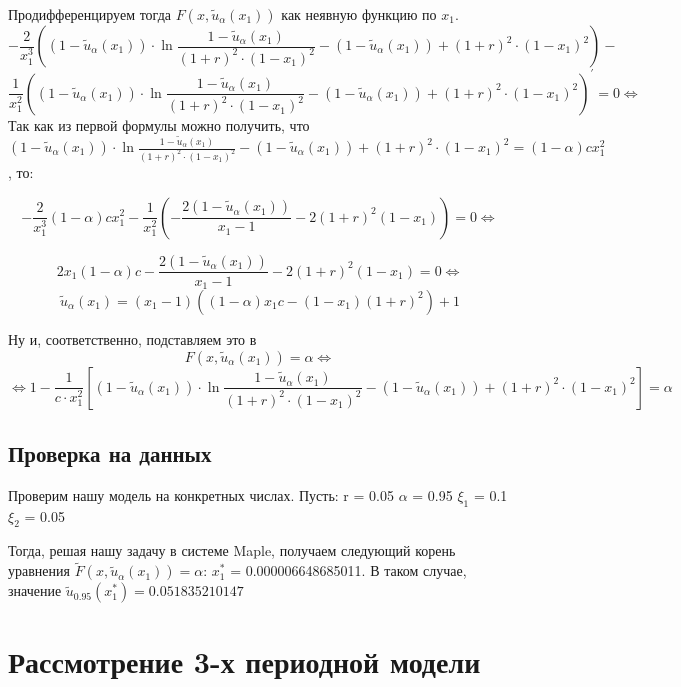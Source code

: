 \documentclass[14pt,a4paper]{article}
\theoremstyle{plain}
\theoremstyle{definition}
\begin{document}
\vspace{1pc}
Продифференцируем тогда $F(x,\tilde{u}_\alpha(x_1))$ как неявную функцию по $x_1$.
\vspace{1pc}
$$
-\frac{2}{x_1^3}\left( (1-\tilde{u}_\alpha(x_1) )\cdot \ln \frac{1-\tilde{u}_\alpha(x_1)}{(1+r)^2 \cdot (1-x_1)^2} - (1-\tilde{u}_\alpha(x_1)) + (1+r)^2 \cdot (1-x_1)^2 \right) -
$$
$$
\frac{1}{x_1^2}\left(  (1-\tilde{u}_\alpha(x_1) )\cdot \ln \frac{1-\tilde{u}_\alpha(x_1)}{(1+r)^2 \cdot (1-x_1)^2} - (1-\tilde{u}_\alpha(x_1)) + (1+r)^2 \cdot (1-x_1)^2  \right)^\prime  = 0 \Leftrightarrow
$$
\vspace{2pc}
Так как из первой формулы можно получить, что $ (1-\tilde{u}_\alpha(x_1)) \cdot \ln \frac{1-\tilde{u}_\alpha(x_1)}{(1+r)^2 \cdot (1-x_1)^2} - (1-\tilde{u}_\alpha(x_1)) + (1+r)^2 \cdot (1-x_1)^2 = (1-\alpha) c x_1^2$, то:

\vspace{2pc}
$$
-\frac{2}{x_1^3} (1-\alpha)cx_1^2 - \frac{1}{x_1^2}\left(-\frac{2 (1-\tilde{u}_\alpha(x_1))}{x_1-1} - 2(1+r)^2(1-x_1)\right)=0 \Leftrightarrow
$$

$$
2x_1(1-\alpha)c - \frac{2 (1-\tilde{u}_\alpha(x_1))}{x_1-1} - 2(1+r)^2(1-x_1)=0 \Leftrightarrow
$$
$$
\tilde{u}_\alpha(x_1) = (x_1-1)\left((1-\alpha)x_1c - (1-x_1)(1+r)^2 \right)+1
$$

Ну и, соответственно, подставляем это в
$$
F(x,\tilde{u}_\alpha(x_1)) = \alpha \Leftrightarrow
$$
$$
\Leftrightarrow 1-\frac{1}{c \cdot x_1^2}\left[ (1-\tilde{u}_\alpha(x_1)) \cdot \ln \frac{1-\tilde{u}_\alpha(x_1)}{(1+r)^2 \cdot (1-x_1)^2} - (1 - \tilde{u}_\alpha(x_1)) +(1+r)^2 \cdot (1-x_1)^2 \right] = \alpha
$$

 \subsection{Проверка на данных}
\vspace{2pc}


Проверим нашу модель на конкретных числах.
Пусть:
r = 0.05
$\alpha$ = 0.95
$\xi_1$ = 0.1
$\xi_2$ = 0.05

Тогда, решая нашу задачу в системе Maple, получаем следующий корень уравнения $\tilde{F} (x,\tilde{u}_\alpha(x_1)) = \alpha$:
$x_1^*$ = 0.000006648685011.
В таком случае, значение $\tilde{u}_{0.95}(x_1^*) = 0.051835210147$

 \section{Рассмотрение 3-х периодной модели}
\end{document}
